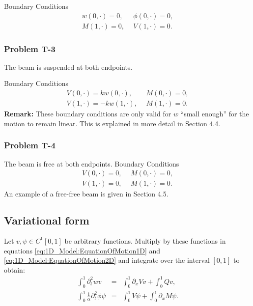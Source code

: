 \documentclass[../../main.tex]{subfiles}
\begin{document}
{Boundary Conditions}\\
\begin{eqnarray*}
	w(0,\cdot) = 0, \ \ &\phi(0,\cdot) = 0, \label{eq:1D_Model:ProblemT2BC1}\\
	M(1,\cdot) = 0, \ \ &V(1,\cdot) = 0. \label{eq:1D_Model:ProblemT2BC2}
\end{eqnarray*}

\subsubsection*{Problem T-3}\label{sssec:1D_Model:ProblemT3}
The beam is suspended at both endpoints.

{Boundary Conditions}\\
\begin{eqnarray*}
	V(0,\cdot) = k w(0,\cdot), \ \ &M(0,\cdot) = 0, \label{eq:1D_Model:ProblemT3BC1}\\
	V(1,\cdot) = -kw(1,\cdot), \ \ &M(1,\cdot) = 0. \label{eq:1D_Model:ProblemT3BC2}
\end{eqnarray*}
\textbf{Remark:} These boundary conditions are only valid for $w$ ``small enough'' for the motion to remain linear. This is explained in more detail in Section 4.4.

\subsubsection*{Problem T-4}\label{sssec:1D_Model:ProblemT4}
The beam is free at both endpoints.
{Boundary Conditions}\\
\begin{eqnarray*}
	V(0,\cdot) = 0, \ \ &M(0,\cdot) = 0, \label{eq:1D_Model:ProblemT4BC1}\\
	V(1,\cdot) = 0, \ \ &M(1,\cdot) = 0. \label{eq:1D_Model:ProblemT4BC2}
\end{eqnarray*}
An example of a free-free beam is given in Section 4.5.

\subsection{Variational form}\label{ssec:1D_Model:VariationalForm}
Let $v, \psi \in C^1[0,1]$ be arbitrary functions. Multiply by these functions in equations \eqref{eq:1D_Model:EquationOfMotion1D} and \eqref{eq:1D_Model:EquationOfMotion2D} and integrate over the interval $[0,1]$ to obtain:
\begin{eqnarray*}
	\int_{0}^{1} \partial_{t}^{2} w v &=& \int_{0}^{1}\partial_{x}V v  + \int_{0}^{1} Q v ,\\
	\int_{0}^{1}\frac{1}{\alpha} \partial_{t}^{2} \phi \psi  &=& \int_{0}^{1}V \psi  + \int_{0}^{1}\partial_{x}M \psi.
\end{eqnarray*}
\end{document}
